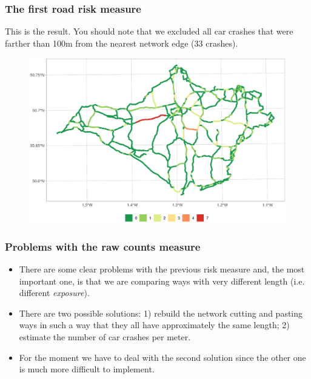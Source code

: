 \documentclass[c,10pt,pdftex]{beamer}
\begin{document}
\begin{frame}
\frametitle{The first road risk measure}
\vspace{-0.25cm}
This is the result. You should note that we excluded all car crashes that were farther than 100m from the nearest network edge (33  crashes). 
\begin{figure}
	\centering
	\includegraphics[width=\linewidth]{images/count_on_nearest_street}
\end{figure}
\end{frame}

\begin{frame}
\frametitle{Problems with the raw counts measure}
\begin{itemize}
	\setlength\itemsep{1em}
	\item There are some clear problems with the previous risk measure and, the most important one, is that we are comparing ways with very different length (i.e. different \textit{exposure}). 
	\item There are two possible solutions: 1) rebuild the network cutting and pasting ways in such a way that they all have approximately the same length; 2) \alert{estimate the number of car crashes per meter}. 
	\item For the moment we have to deal with the second solution since the other one is much more difficult to implement. 
\end{itemize}
\end{frame}
\end{document}
